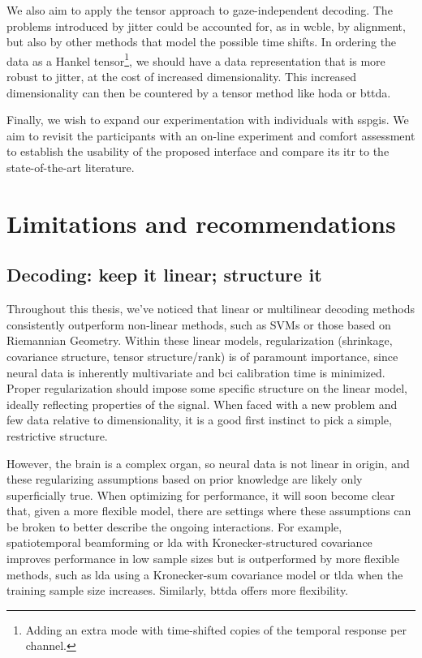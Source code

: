 We also aim to apply the tensor approach to gaze-independent decoding.
The problems introduced by jitter could be accounted for, as in \ac{wcble}, by
alignment, but also by other methods that model the possible time shifts.
In ordering the data as a Hankel tensor\footnote{Adding an extra mode with
time-shifted copies of the temporal response per channel.}, we should have a
data representation that is more robust to jitter, at the cost of increased
dimensionality.
This increased dimensionality can then be countered by a tensor method like
\ac{hoda} or \ac{bttda}.

Finally, we wish to expand our experimentation with individuals with
\acp{sspgi}.
We aim to revisit the participants with an on-line experiment and comfort
assessment to establish the usability of the proposed interface and compare its
\ac{itr} to the state-of-the-art literature.


\section{Limitations and recommendations}

\subsection{Decoding: keep it linear; structure it}

Throughout this thesis, we've noticed that linear or multilinear decoding
methods consistently outperform non-linear methods, such as SVMs or those based
on Riemannian Geometry.
Within these linear models, regularization (shrinkage, covariance structure,
tensor structure/rank) is of paramount importance, since neural data is
inherently multivariate and \ac{bci} calibration time is minimized.
Proper regularization should impose some specific structure on the linear model,
ideally reflecting properties of the signal.
When faced with a new problem and few data relative to dimensionality, it is a
good first instinct to pick a simple, restrictive structure.

However, the brain is a complex organ, so neural data is not linear in origin, and
these regularizing assumptions based on prior knowledge are likely only
superficially true.
When optimizing for performance, it will soon become clear that, given a more
flexible model, there are
settings where these assumptions can be broken to better describe the ongoing
interactions.
For example, spatiotemporal beamforming or \ac{lda} with Kronecker-structured covariance
improves performance in low sample sizes but is outperformed by more flexible
methods, such as \ac{lda} using a Kronecker-sum covariance model or \ac{tlda}
when the training sample size increases.
Similarly, \ac{bttda} offers more flexibility.


